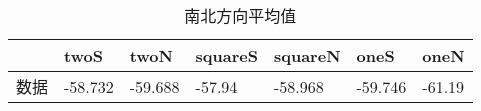 \begin{table}[htbp]
\centering
\begin{tabular}{lllllll}
 \toprule
   & twoS    & twoN    & squareS & squareN & oneS    & oneN   \\ 
 \midrule
数据 & -58.732 & -59.688 & -57.94  & -58.968 & -59.746 & -61.19 \\ 
\bottomrule
\end{tabular}
\caption{南北方向平均值}
\label{table:sourth-north-mean}
\end{table}
